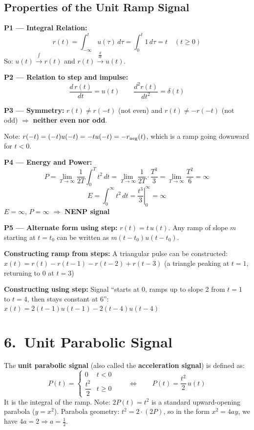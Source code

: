 \documentclass[10pt,a4paper]{article}
\newcommand{\Intt}{\displaystyle\int_{-\infty}^{t}}
\begin{document}
\subsection*{Properties of the Unit Ramp Signal}

\begin{propbox}
\textbf{P1 --- Integral Relation:}
\[
  r(t) = \Intt u(\tau)\,d\tau = \int_0^t 1\,d\tau = t \quad (t \geq 0)
\]
So: $u(t)\xrightarrow{\int} r(t)$ and $r(t)\xrightarrow{\frac{d}{dt}} u(t)$.

\medskip
\textbf{P2 --- Relation to step and impulse:}
\[
  \frac{d\,r(t)}{dt} = u(t) \qquad \frac{d^2 r(t)}{dt^2} = \delta(t)
\]

\medskip
\textbf{P3 --- Symmetry:}
$r(t) \neq r(-t)$ (not even) and $r(t) \neq -r(-t)$ (not odd) $\Rightarrow$ \textbf{neither even nor odd}.

Note: $r(-t)=(-t)u(-t)=-tu(-t)=-r_{\rm neg}(t)$, which is a ramp going downward for $t<0$.

\medskip
\textbf{P4 --- Energy and Power:}
\[
  P = \lim_{T\to\infty}\frac{1}{2T}\int_0^T t^2\,dt = \lim_{T\to\infty}\frac{1}{2T}\cdot\frac{T^3}{3} = \lim_{T\to\infty}\frac{T^2}{6} = \infty
\]
\[
  E = \int_0^\infty t^2\,dt = \left.\frac{t^3}{3}\right|_0^\infty = \infty
\]
$E = \infty$, $P = \infty$ $\Rightarrow$ \textbf{NENP signal}

\medskip
\textbf{P5 --- Alternate form using step:}
$r(t) = t\,u(t)$. Any ramp of slope $m$ starting at $t=t_0$ can be written as $m(t-t_0)u(t-t_0)$.
\end{propbox}

\begin{exbox}
\textbf{Constructing ramp from steps:}
A triangular pulse can be constructed:
$x(t)=r(t)-r(t-1)-r(t-2)+r(t-3)$ (a triangle peaking at $t=1$, returning to $0$ at $t=3$)

\textbf{Constructing using step:}
Signal ``starts at 0, ramps up to slope 2 from $t=1$ to $t=4$, then stays constant at 6'':
$x(t)=2(t-1)u(t-1)-2(t-4)u(t-4)$
\end{exbox}

\section{6.\ Unit Parabolic Signal}

\begin{defbox}
The \textbf{unit parabolic signal} (also called the \textbf{acceleration signal}) is defined as:
\[
  P(t) = \begin{cases} 0 & t < 0 \\ \dfrac{t^2}{2} & t \geq 0 \end{cases}
  \qquad\Leftrightarrow\qquad P(t) = \frac{t^2}{2}\,u(t)
\]
It is the integral of the ramp. Note: $2P(t)=t^2$ is a standard upward-opening parabola ($y=x^2$).
Parabola geometry: $t^2 = 2\cdot(2P)$, so in the form $x^2=4ay$, we have $4a=2 \Rightarrow a=\tfrac{1}{2}$.
\end{defbox}
\end{document}
